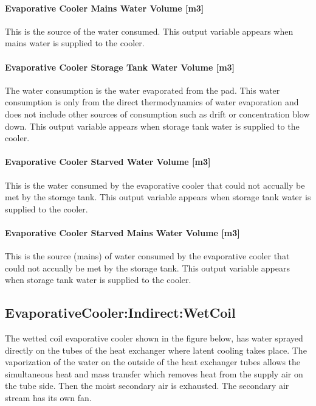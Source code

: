 \paragraph{Evaporative Cooler Mains Water Volume {[}m3{]}}\label{evaporative-cooler-mains-water-volume-m3-2}

This is the source of the water consumed. This output variable appears when mains water is supplied to the cooler.

\paragraph{Evaporative Cooler Storage Tank Water Volume {[}m3{]}}\label{evaporative-cooler-storage-tank-water-volume-m3-2}

The water consumption is the water evaporated from the pad. This water consumption is only from the direct thermodynamics of water evaporation and does not include other sources of consumption such as drift or concentration blow down. This output variable appears when storage tank water is supplied to the cooler.

\paragraph{Evaporative Cooler Starved Water Volume {[}m3{]}}\label{evaporative-cooler-starved-water-volume-m3-2}

This is the water consumed by the evaporative cooler that could not accually be met by the storage tank. This output variable appears when storage tank water is supplied to the cooler.

\paragraph{Evaporative Cooler Starved Mains Water Volume {[}m3{]}}\label{evaporative-cooler-starved-mains-water-volume-m3-2}

This is the source (mains) of water consumed by the evaporative cooler that could not accually be met by the storage tank. This output variable appears when storage tank water is supplied to the cooler.

\subsection{EvaporativeCooler:Indirect:WetCoil}\label{evaporativecoolerindirectwetcoil}

The wetted coil evaporative cooler shown in the figure below, has water sprayed directly on the tubes of the heat exchanger where latent cooling takes place. The vaporization of the water on the outside of the heat exchanger tubes allows the simultaneous heat and mass transfer which removes heat from the supply air on the tube side. Then the moist secondary air is exhausted. The secondary air stream has its own fan.

